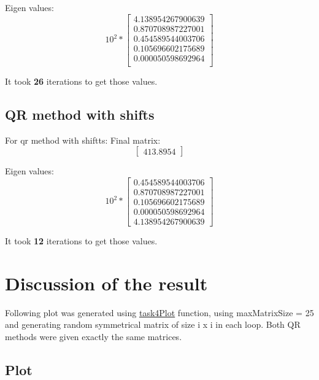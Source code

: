 \documentclass[12pt]{report}
\begin{document}
Eigen values:
\[
10^{2} *
\begin{bmatrix}
  4.138954267900639 \\
   0.870708987227001 \\
   0.454589544003706 \\
   0.105696602175689 \\
   0.000050598692964 \\
\end{bmatrix}
\]

It took \textbf{26} iterations to get those values.

\subsection{QR method with shifts}
For qr method with shiftts:
Final matrix:
\[
\begin{bmatrix}
413.8954
\end{bmatrix}
\]

Eigen values:
\[
10^{2} *
\begin{bmatrix}
  0.454589544003706 \\
  0.870708987227001 \\
  0.105696602175689 \\
  0.000050598692964 \\
  4.138954267900639
\end{bmatrix}
\]

It took \textbf{12} iterations to get those values.

\newpage
\section{Discussion of the result}
Following plot was generated using \hyperlink{function4}{task4Plot} function, using maxMatrixSize = 25 and generating random symmetrical matrix of size i x i in each loop. Both QR methods were given exactly the same matrices.
\subsection{Plot}
\end{document}
